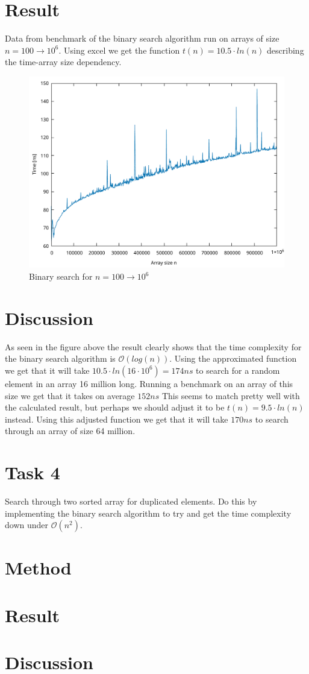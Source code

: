 \documentclass[a4paper,11pt]{article}
\begin{document}
\section*{Result}
Data from benchmark of the binary search algorithm run on arrays of size $n = 100 \to 10^6$.
Using excel we get the function $t(n)=10.5\cdot ln(n)$ describing the time-array size dependency.
\begin{figure}[h!]
  \centering
  \includegraphics[width=\textwidth]{binaryLinearSearch.pdf}
  \caption{Binary search for $n =100\to 10^6$}
\end{figure}

\FloatBarrier
\section*{Discussion}
As seen in the figure above the result clearly shows that the time complexity for the binary
search algorithm is $\mathcal{O}(log(n))$. Using the approximated function we get that it
will take $10.5 \cdot ln(16\cdot 10^6)=174ns$ to search for a random element in an array
16 million long. Running a benchmark on an array of this size we get that it takes on average
$152ns$ This seems to match pretty well with the calculated result, but perhaps we should
adjust it to be $t(n)=9.5\cdot ln(n)$ instead. Using this adjusted function we get that it
will take $170ns$ to search through an array of size 64 million.

\section*{Task 4}

Search through two sorted array for duplicated elements. Do this by implementing the binary
search algorithm to try and get the time complexity down under $\mathcal{O}(n^2)$.
\section*{Method}

\section*{Result}

\section*{Discussion}
\end{document}
